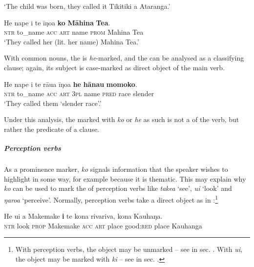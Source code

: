 \glt 
‘The child was born, they called it Tikitiki a Ataranga.’ \textstyleExampleref{[R532-02.005]}
\z

\ea\label{ex:8.148}
\gll He nape i te {\ꞌ}īŋoa \textbf{ko} \textbf{Māhina} \textbf{Tea}. \\
\textsc{ntr} to\_name \textsc{acc} \textsc{art} name \textsc{prom} Mahina Tea \\

\glt
‘They called her (lit. her name) Mahina Tea.’ \textstyleExampleref{[R399.003]} 
\z

With common nouns, the  is \textit{he}{}-marked, and the  can be analysed as a classifying clause; again, its subject is case-marked as direct object of the main verb.

\ea\label{ex:8.149}
\gll He nape i te rāua {\ꞌ}īŋoa \textbf{he} \textbf{hānau} \textbf{momoko}. \\
\textsc{ntr} to\_name \textsc{acc} \textsc{art} \textsc{3pl} name \textsc{pred} race slender \\

\glt
‘They called them ‘slender race’.’ \textstyleExampleref{[R370.008]} 
\z

Under this analysis, the  marked with \textit{ko} or \textit{he} as such is not a  of the verb, but rather the predicate of a  clause.

\subparagraph{Perception verbs} As a prominence marker, \textit{ko} signals information that the speaker wishes to highlight in some way, for example because it is thematic. This may explain why \textit{ko} can be used to mark the  of perception verbs like \textit{take{\ꞌ}a} ‘see’, \textit{u{\ꞌ}i} ‘look’ and \textit{ŋaro{\ꞌ}a} ‘perceive’. Normally, perception verbs take a direct object as in :\footnote{\label{fn:443}With  perception verbs, the object may be unmarked – see  in sec. . With \textit{u{\ꞌ}i}, the object may be marked with \textit{ki} – see  in sec. .}

\ea\label{ex:8.150}
\gll He u{\ꞌ}i a Makemake \textbf{i} te kona rivariva, kona Kauhaŋa. \\
\textsc{ntr} look \textsc{prop} Makemake \textsc{acc} \textsc{art} place good:\textsc{red} place Kauhanga \\

